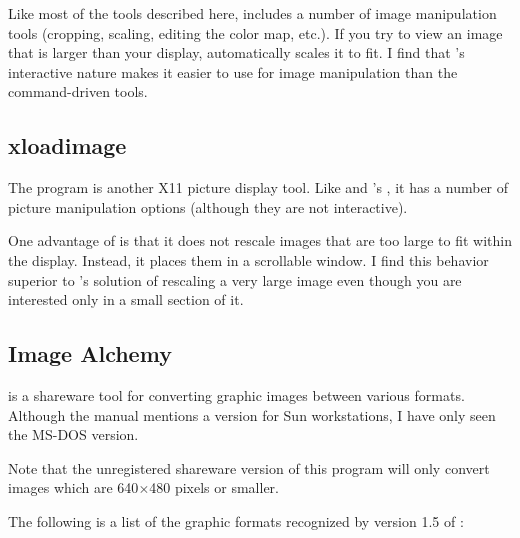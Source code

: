   Like most of the tools described here,  includes a
  number of image manipulation tools (cropping, scaling, editing
  the color map, etc.). If you try to view an image that is larger 
  than your display,  automatically scales it to fit.
  I find that 's interactive
  nature makes it easier to use for image manipulation than the
  command-driven tools.

\newpage
\subsection{xloadimage}

  The  program is another X11 picture display
  tool.  Like  and 's , it
  has a number of picture manipulation options (although they are
  not interactive).

  One advantage of  is that it does not rescale images
  that are too large to fit within the display.  Instead, it places them in a
  scrollable window.  I find this behavior superior to 's solution
  of rescaling a very large image even though you are interested only in a
  small section of it.

\subsection{Image Alchemy}

   is a shareware tool for converting graphic
  images between various formats.  Although the manual mentions a version for
  Sun workstations, I have only seen the MS-DOS version.

  Note that the unregistered shareware version of this program will only
  convert images which are 640$\times$480 pixels or smaller.

  The following is a list of the graphic formats recognized by
  version 1.5 of :

